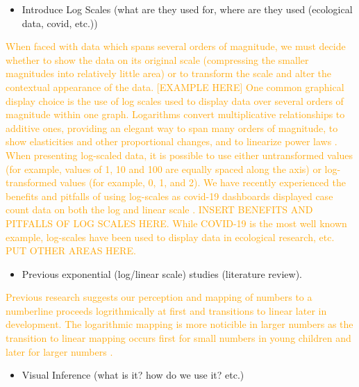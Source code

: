 \documentclass[]{interact}
\theoremstyle{plain}%
\theoremstyle{definition}
\theoremstyle{remark}
\def\tightlist{}
\begin{document}
\begin{itemize}
\tightlist
\item
  Introduce Log Scales (what are they used for, where are they used
  (ecological data, covid, etc.))
\end{itemize}

\textcolor{Orange}{
When faced with data which spans several orders of magnitude, we must decide whether to show the data on its original scale (compressing the smaller magnitudes into relatively little area) or to transform the scale and alter the contextual appearance of the data. [EXAMPLE HERE]
One common graphical display choice is the use of log scales used to display data over several orders of magnitude within one graph. 
Logarithms convert multiplicative relationships to additive ones, providing an elegant way to span many orders of magnitude, to show elasticities and other proportional changes, and to linearize power laws \citep{menge_logarithmic_2018}. 
When presenting log-scaled data, it is possible to use either untransformed values (for example, values of 1, 10 and 100 are equally spaced along the axis) or log-transformed values (for example, 0, 1, and 2). 
We have recently experienced the benefits and pitfalls of using log-scales as covid-19 dashboards displayed case count data on both the log and linear scale \citep{wade_fagen_ulmschneider_2020}. 
INSERT BENEFITS AND PITFALLS OF LOG SCALES HERE. 
While COVID-19 is the most well known example, log-scales have been used to display data in ecological research, etc. 
PUT OTHER AREAS HERE.
}

\begin{itemize}
\tightlist
\item
  Previous exponential (log/linear scale) studies (literature review).
\end{itemize}

\textcolor{Orange}{
Previous research suggests our perception and mapping of numbers to a numberline proceeds logrithmically at first and transitions to linear later in development. 
The logarithmic mapping is more noticible in larger numbers as the transition to linear mapping occurs first for small numbers in young children and later for larger numbers \citep{varshney_why_2013, siegler_numerical_2017, dehaeneLogLinearDistinct2008}.
}

\begin{itemize}
\tightlist
\item
  Visual Inference (what is it? how do we use it? etc.)
\end{itemize}
\end{document}
